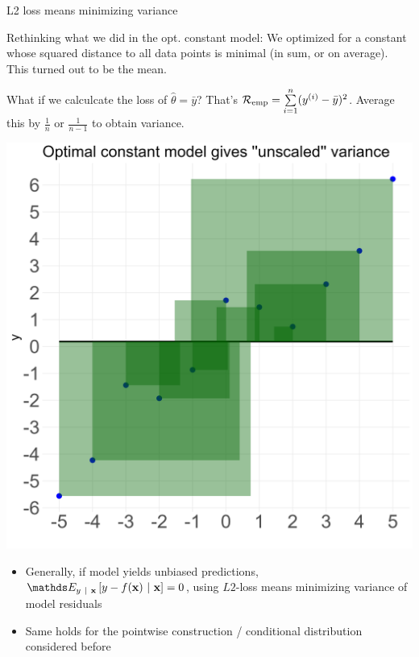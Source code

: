 \documentclass[11pt,compress,t,notes=noshow, xcolor=table]{beamer}
\begin{document}
\begin{vbframe}{L2 loss means minimizing variance}

Rethinking what we did in the opt. constant model:
We optimized for a constant whose squared distance to all data points is minimal
(in sum, or on average). This turned out to be the mean.

\vspace{0.1cm}

What if we calculcate the loss of $\hat{\theta} = \bar{y}$? That's ${\textstyle \mathcal{R}_{\text{emp}} = \sum\limits_{i=1}^n (y^{(i)} - \bar{y})^2}$. Average this by $\frac{1}{n}$ or $\frac{1}{n-1}$ 
to obtain variance. 

\vspace{0.2cm}


\begin{minipage}{0.5\textwidth}
    \centering
    \includegraphics[width=0.9\linewidth]{figure_man/plot_const_var.png}
\end{minipage}%
\begin{minipage}{0.5\textwidth}
    \begin{itemize}
    \small
        \item  Generally, if model yields unbiased predictions, { $\E_{y~|~\xv}\left[y-\fx~|~\xv\right]=0$}, using $L2$-loss means minimizing variance of model residuals
        \item Same holds for the pointwise construction / conditional distribution considered before
     \end{itemize}
\end{minipage}



\end{vbframe}
\end{document}
